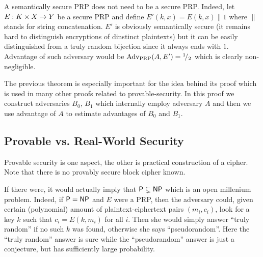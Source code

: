 \begin{note}
	A semantically secure PRP does not need to be a secure PRP. Indeed, let $E: K\times X\rightarrow Y$ be a secure PRP and define $E'(k,x) = E(k,x)\|1$ where $\|$ stands for string concatenation. $E'$ is obviously semantically secure (it remains hard to distinguish encryptions of dinstinct plaintexts) but it can be easily distinguished from a truly random bijection since it always ends with $1$. Advantage of such adversary would be $\operatorname*{Adv_{PRP}}(A,E') = {}^{1}\!/_{2}$ which is clearly non-negligible.
\end{note}

The previous theorem is especially important for the idea behind its proof which is used in many other proofs related to provable-security. In this proof we construct adversaries $B_0$, $B_1$ which internally employ adversary $A$ and then we use advantage of $A$ to estimate advantages of $B_0$ and $B_1$.



\subsection{Provable vs. Real-World Security}
\label{sec:provable}

Provable security is one aspect, the other is practical construction of a cipher. Note that there is no provably secure block cipher known.

If there were, it would actually imply that $\mathsf{P} \subsetneq \mathsf{NP}$ which is an open millenium problem. Indeed, if $\mathsf{P} = \mathsf{NP}$ and $E$ were a PRP, then the adversary could, given certain (polynomial) amount of plaintext-ciphertext pairs $(m_i,c_i)$, look for a key $k$ such that $c_i = E(k,m_i)$ for all $i$. Then she would simply answer ``truly random'' if no such $k$ was found, otherwise she says ``pseudorandom''. Here the ``truly random'' answer is sure while the ``pseudorandom'' answer is just a conjecture, but has sufficiently large probability.

